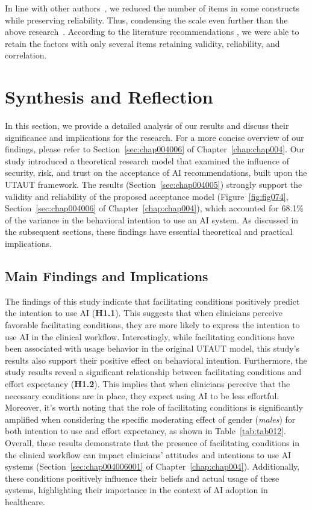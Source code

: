 In line with other authors~\cite{CALISTO2022102922}, we reduced the number of items in some constructs while preserving reliability.
Thus, condensing  the scale even further than the above research~\cite{KHALILZADEH2017460}.
According to the literature recommendations \cite{SIGERSON201887}, we were able to retain the factors with only several items retaining validity, reliability, and correlation.

\section{Synthesis and Reflection}
\label{chap:app002005}

\textcolor{revised}{In this section, we provide a detailed analysis of our results and discuss their significance and implications for the research.
For a more concise overview of our findings, please refer to Section~\ref{sec:chap004006} of Chapter~\ref{chap:chap004}.
Our study introduced a theoretical research model that examined the influence of security, risk, and trust on the acceptance of \ac{AI} recommendations, built upon the \ac{UTAUT} framework.
The results (Section~\ref{sec:chap004005}) strongly support the validity and reliability of the proposed acceptance model (Figure~\ref{fig:fig074}, Section~\ref{sec:chap004006} of Chapter~\ref{chap:chap004}), which accounted for 68.1\% of the variance in the behavioral intention to use an AI system.
As discussed in the subsequent sections, these findings have essential theoretical and practical implications.}

\subsection{Main Findings and Implications}
\label{chap:app002005001}

\textcolor{revised}{The findings of this study indicate that facilitating conditions positively predict the intention to use \ac{AI} ({\bf H1.1}).
This suggests that when clinicians perceive favorable facilitating conditions, they are more likely to express the intention to use \ac{AI} in the clinical workflow.
Interestingly, while facilitating conditions have been associated with usage behavior in the original \ac{UTAUT} model, this study's results also support their positive effect on behavioral intention.
Furthermore, the study results reveal a significant relationship between facilitating conditions and effort expectancy ({\bf H1.2}).
This implies that when clinicians perceive that the necessary conditions are in place, they expect using \ac{AI} to be less effortful.
Moreover, it's worth noting that the role of facilitating conditions is significantly amplified when considering the specific moderating effect of gender ({\it males}) for both intention to use and effort expectancy, as shown in Table~\ref{tab:tab012}.
Overall, these results demonstrate that the presence of facilitating conditions in the clinical workflow can impact clinicians' attitudes and intentions to use \ac{AI} systems (Section~\ref{sec:chap004006001} of Chapter~\ref{chap:chap004}).
Additionally, these conditions positively influence their beliefs and actual usage of these systems, highlighting their importance in the context of \ac{AI} adoption in healthcare.}

